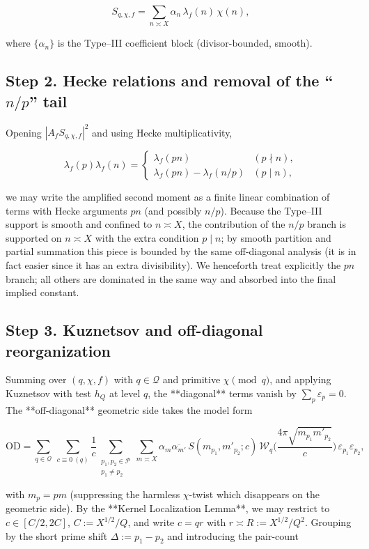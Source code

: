 \documentclass[11pt]{article}
\theoremstyle{definition}
\theoremstyle{remark}
\begin{document}
$$
S_{q,\chi,f}=\sum_{n\asymp X}\alpha_n\,\lambda_f(n)\,\chi(n),
$$

where $\{\alpha_n\}$ is the Type–III coefficient block (divisor-bounded, smooth).

\subsection*{Step 2. Hecke relations and removal of the “$n/p$” tail}

Opening $|A_f S_{q,\chi,f}|^2$ and using Hecke multiplicativity,

$$
\lambda_f(p)\lambda_f(n)=
\begin{cases}
\lambda_f(pn) & (p\nmid n),\\
\lambda_f(pn)-\lambda_f(n/p) & (p\mid n),
\end{cases}
$$

we may write the amplified second moment as a finite linear combination of terms with Hecke arguments $pn$ (and possibly $n/p$). Because the Type–III support is smooth and confined to $n\asymp X$, the contribution of the $n/p$ branch is supported on $n\asymp X$ with the extra condition $p\mid n$; by smooth partition and partial summation this piece is bounded by the same off-diagonal analysis (it is in fact easier since it has an extra divisibility). We henceforth treat explicitly the $pn$ branch; all others are dominated in the same way and absorbed into the final implied constant.

\subsection*{Step 3. Kuznetsov and off-diagonal reorganization}

Summing over $(q,\chi,f)$ with $q\in\mathcal Q$ and primitive $\chi\pmod q$, and applying Kuznetsov with test $h_Q$ at level $q$, the **diagonal** terms vanish by $\sum_p\varepsilon_p=0$. The **off-diagonal** geometric side takes the model form

$$
\mathrm{OD}
=\sum_{q\in\mathcal Q}\ \sum_{c\equiv 0\ (q)} \frac{1}{c}\!
\sum_{\substack{p_1,p_2\in\mathcal P\\ p_1\ne p_2}}\!
\sum_{m\asymp X} \alpha_m\overline{\alpha_{m'}}\,
S(m_{p_1},m'_{p_2};c)\,
\mathcal W_q\!\Big(\frac{4\pi\sqrt{m_{p_1}m'_{p_2}}}{c}\Big)\,
\varepsilon_{p_1}\varepsilon_{p_2},
$$

with $m_{p}=pm$ (suppressing the harmless $\chi$-twist which disappears on the geometric side). By the **Kernel Localization Lemma**, we may restrict to $c\in[C/2,2C]$, $C:=X^{1/2}/Q$, and write $c=qr$ with $r\asymp R:=X^{1/2}/Q^2$. Grouping by the short prime shift $\Delta:=p_1-p_2$ and introducing the pair-count
\end{document}
